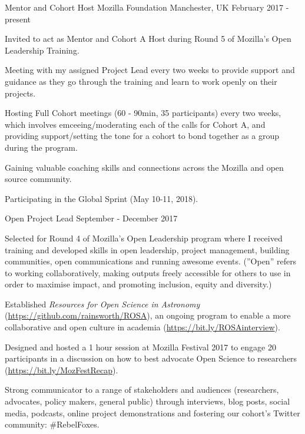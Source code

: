 \begin{cventries}
\cventry
    {Mentor and Cohort Host}
    {Mozilla Foundation}
    {Manchester, UK}
    {February 2017 - present}
    {
      \begin{cvitems}
        \item{Invited to act as Mentor and Cohort A Host during Round 5 of Mozilla's Open Leadership Training.}
        \item{Meeting with my assigned Project Lead every two weeks to provide support and guidance as they go through the training and learn to work openly on their projects.}
        \item{Hosting Full Cohort meetings (60 - 90min, 35 participants) every two weeks, which involves emceeing/moderating each of the calls for Cohort A, and providing support/setting the tone for a cohort to bond together as a group during the program.}
        \item{Gaining valuable coaching skills and connections across the Mozilla and open source community.}
        \item{Participating in the Global Sprint (May 10-11, 2018).}
      \end{cvitems}
    }
\cventry
    {Open Project Lead}
    {}
    {}
    {September - December 2017}
    {
      \begin{cvitems}
        \item{Selected for Round 4 of Mozilla's Open Leadership program where I received training and developed skills in open leadership, project management, building communities, open communications and running awesome events. (''Open'' refers to working collaboratively, making outputs freely accessible for others to use in order to maximise impact, and promoting inclusion, equity and diversity.)}
        \item{Established \textit{Resources for Open Science in Astronomy} (\url{https://github.com/rainsworth/ROSA}), an ongoing program to enable a more collaborative and open culture in academia (\url{https://bit.ly/ROSAinterview}).}
        \item {Designed and hosted a 1 hour session at Mozilla Festival 2017 to engage 20 participants in a discussion on how to best advocate Open Science to researchers (\url{https://bit.ly/MozFestRecap}).}
        \item {Strong communicator to a range of stakeholders and audiences (researchers, advocates, policy makers, general public) through interviews, blog posts, social media, podcasts, online project demonstrations and fostering our cohort's Twitter community: \#RebelFoxes.}

\end{cvitems}}
\end{cventries}
